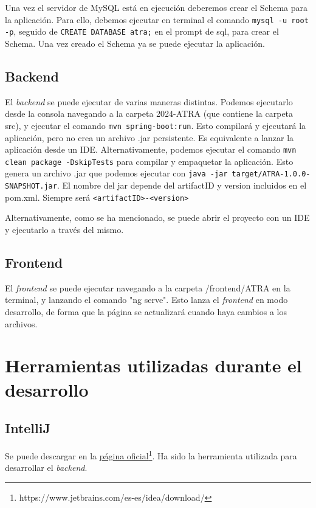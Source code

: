Una vez el servidor de MySQL está en ejecución deberemos crear el Schema para la aplicación. Para ello, debemos ejecutar en terminal el comando \texttt{mysql -u root -p}, seguido de \texttt{CREATE DATABASE atra;} en el prompt de sql, para crear el Schema. Una vez creado el Schema ya se puede ejecutar la aplicación.

\subsection{Backend}
El \textit{backend} se puede ejecutar de varias maneras distintas. Podemos ejecutarlo desde la consola navegando a la carpeta 2024-ATRA (que contiene la carpeta src), y ejecutar el comando \texttt{mvn spring-boot:run}. Esto compilará y ejecutará la aplicación, pero no crea un archivo .jar persistente. Es equivalente a lanzar la aplicación desde un IDE. Alternativamente, podemos ejecutar el comando \texttt{mvn clean package -DskipTests} para compilar y empaquetar la aplicación. Esto genera un archivo .jar que podemos ejecutar con \texttt{java -jar target/ATRA-1.0.0-SNAPSHOT.jar}. El nombre del jar depende del artifactID y version incluidos en el pom.xml. Siempre será \texttt{<artifactID>-<version>}

Alternativamente, como se ha mencionado, se puede abrir el proyecto con un IDE y ejecutarlo a través del mismo.

\subsection{Frontend}
El \textit{frontend} se puede ejecutar navegando a la carpeta /frontend/ATRA en la terminal, y lanzando el comando "ng serve". Esto lanza el \textit{frontend} en modo desarrollo, de forma que la página se actualizará cuando haya cambios a los archivos. 

\section{Herramientas utilizadas durante el desarrollo}

\subsection{IntelliJ}
Se puede descargar en la \href{https://www.jetbrains.com/es-es/idea/download/}{\uline{página oficial}\footnote{\url{https://www.jetbrains.com/es-es/idea/download/}}}. Ha sido la herramienta utilizada para desarrollar el \textit{backend}.


